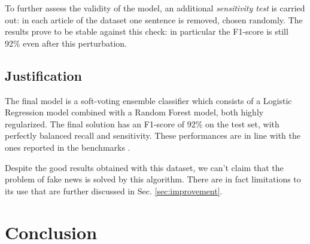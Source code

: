 \documentclass[a4paper,12pt]{article} %
\begin{document}
To further assess the validity of the model, an additional \textit{sensitivity test} is carried out:
in each article of the dataset one sentence is removed, chosen randomly.
The results prove to be stable against this check: in particular the F1-score
is still 92\% even after this perturbation.


\subsection{Justification}
The final model is a soft-voting ensemble classifier which
consists of a Logistic Regression model combined with a Random Forest model,
both highly regularized.
The final solution has an F1-score of 92\% on the test set,
with perfectly balanced recall and sensitivity. These performances are
in line with the ones reported in the benchmarks \cite{NYDSA, jarmul}.

Despite the good results obtained with this dataset,
we can't claim that the problem of fake news is solved by this algorithm.
There are in fact limitations to its use that are further discussed
in Sec. \ref{sec:improvement}.



\section{Conclusion}
\end{document}
